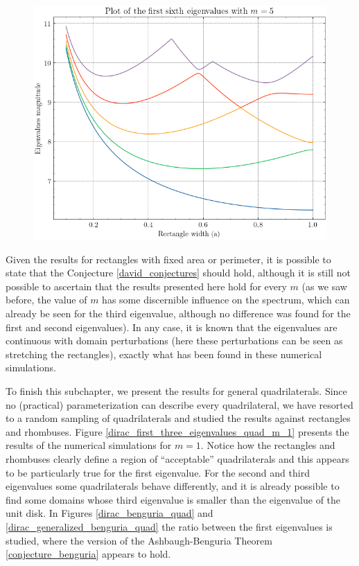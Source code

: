 \begin{figure}[!htb]
\begin{minipage}{.5\textwidth}
      \includegraphics[width=1\linewidth]{Images/Dirac/quad/eigenvalues_rectangle_perimeter_width_m_5.png}
      \captionsetup{width=0.9\linewidth} %
      \label{eigenvalues_rectangle_perimeter_width_m_5}
    \end{minipage}
\end{figure}

Given the results for rectangles with fixed area or perimeter, it is possible to state that the Conjecture \ref{david_conjectures} should hold, although it is still not possible to ascertain that the results presented here hold for every \(m\) (as we saw before, the value of \(m\) has some discernible influence on the spectrum, which can already be seen for the third eigenvalue, although no difference was found for the first and second eigenvalues). In any case, it is known that the eigenvalues are continuous with domain perturbations (here these perturbations can be seen as stretching the rectangles), exactly what has been found in these numerical simulations.

To finish this subchapter, we present the results for general quadrilaterals. Since no (practical) parameterization can describe every quadrilateral, we have resorted to a random sampling of quadrilaterals and studied the results against rectangles and rhombuses. Figure \ref{dirac_first_three_eigenvalues_quad_m_1} presents the results of the numerical simulations for \(m=1\). Notice how the rectangles and rhombuses clearly define a region of ``acceptable'' quadrilaterals and this appears to be particularly true for the first eigenvalue. For the second and third eigenvalues some quadrilaterals behave differently, and it is already possible to find some domains whose third eigenvalue is smaller than the eigenvalue of the unit disk. In Figures \ref{dirac_benguria_quad} and \ref{dirac_generalized_benguria_quad} the ratio between the first eigenvalues is studied, where the version of the Ashbaugh-Benguria Theorem \ref{conjecture_benguria} appears to hold.

